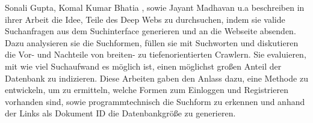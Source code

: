 Sonali Gupta, Komal Kumar Bhatia \cite{gupta2014comparative}, sowie Jayant Madhavan u.a \cite{madhavan2008google} beschreiben in ihrer Arbeit die Idee, Teile des Deep Webs zu durchsuchen, indem sie valide Suchanfragen aus dem Suchinterface generieren und an die Webseite absenden. Dazu analysieren sie die Suchformen, füllen sie mit Suchworten und diskutieren die Vor- und Nachteile von breiten- zu tiefenorientierten Crawlern. Sie evaluieren, mit wie viel Suchaufwand es möglich ist, einen möglichst großen Anteil der Datenbank zu indizieren. Diese Arbeiten gaben den Anlass dazu, eine Methode zu entwickeln, um zu ermitteln, welche Formen zum Einloggen und Registrieren vorhanden sind, sowie programmtechnisch die Suchform zu erkennen und anhand der Links als Dokument ID die Datenbankgröße zu generieren.

\newpage